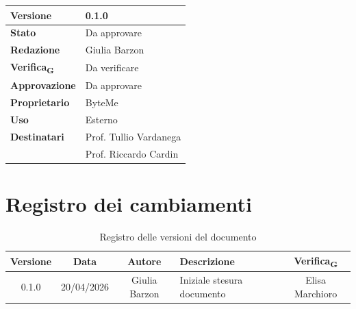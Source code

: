 \documentclass[11pt,a4paper]{article}
\newcommand{\gls}[1]{#1\textsubscript{G}}
\begin{document}
\begin{titlepage}
    \begin{table}[H]
        \centering
        \begin{tabular}{|l|p{5cm}|}
            \hline
            \textbf{Versione} & 0.1.0 \\
            \hline
            \textbf{Stato} & Da approvare \\
            \hline
            \textbf{Redazione} & Giulia Barzon \\
            \hline
            \textbf{\gls{Verifica}} & Da verificare \\
            \hline
            \textbf{Approvazione} & Da approvare \\
            \hline
            \textbf{Proprietario} & ByteMe \\
            \hline
            \textbf{Uso} & Esterno \\
            \hline
            \textbf{Destinatari} & Prof. Tullio Vardanega \\ & Prof. Riccardo Cardin \\
            \hline
        \end{tabular}
    \end{table}
    
    \vfill
\end{titlepage}

\section*{Registro dei cambiamenti}

\begin{table}[H]
    \centering
    \begin{tabularx}{\textwidth}{|c|c|c|>{\raggedright\arraybackslash}X|c|}
        \hline
        \textbf{Versione} & \textbf{Data} & \textbf{Autore} & \textbf{Descrizione} & \textbf{\gls{Verifica}} \\
        \hline
        0.1.0 & 20/04/2026 & Giulia Barzon & Iniziale stesura documento & Elisa Marchioro\\
        \hline
    \end{tabularx}
    \caption{Registro delle versioni del documento}
    \label{tab:versionamento}
\end{table}

\newpage

\tableofcontents
\thispagestyle{empty}
\newpage

\setcounter{page}{1}
\end{document}
